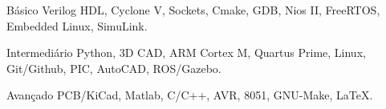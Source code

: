 

\begin{cvskills}

  \cvskill
    {Básico} %
    {Verilog HDL, Cyclone V, Sockets, Cmake, GDB, Nios II, FreeRTOS, Embedded Linux, SimuLink.} %

  \cvskill
    {Intermediário} %
    {Python,  3D CAD, ARM Cortex M, Quartus Prime, Linux, Git/Github, PIC, AutoCAD, ROS/Gazebo.} %

  \cvskill
    {Avançado} %
    {PCB/KiCad, Matlab, C/C++, AVR, 8051, GNU-Make, LaTeX.} %

\end{cvskills}




